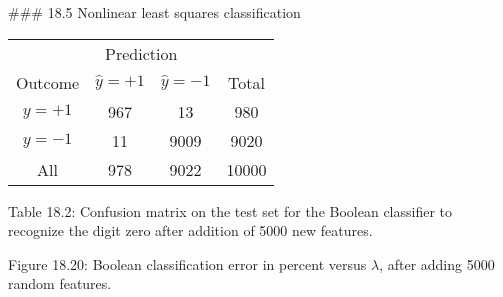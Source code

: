 

### 18.5 Nonlinear least squares classification

\begin{table}
\begin{tabular}{c c c c} \hline \hline \multicolumn{4}{c}{Prediction} \\ \cline{2-4} Outcome & \(\hat{y}=+1\) & \(\hat{y}=-1\) & Total \\ \hline \(y=+1\) & 967 & 13 & 980 \\ \(y=-1\) & 11 & 9009 & 9020 \\ All & 978 & 9022 & 10000 \\ \hline \hline \end{tabular}
\end{table}
Table 18.2: Confusion matrix on the test set for the Boolean classifier to recognize the digit zero after addition of 5000 new features.

Figure 18.20: Boolean classification error in percent versus \(\lambda\), after adding 5000 random features.

